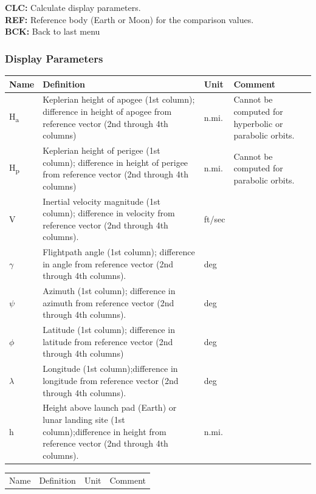 \documentclass[11pt]{article} %
\begin{document}
\textbf{CLC:} Calculate display parameters.\\
\textbf{REF:} Reference body (Earth or Moon) for the comparison values.\\
\textbf{BCK:} Back to last menu\\

\newpage
\begin{landscape}
\subsubsection{Display Parameters}

\begin{center}
\begin{tabular} { L{1cm} L{8cm} L{2cm} L{6cm} }
\hline
Name & Definition & Unit & Comment\\
\hline
H\textsubscript{a} & Keplerian height of apogee (1st column); difference in height of apogee from reference vector (2nd through 4th columns) & n.mi.&Cannot be computed for hyperbolic or parabolic orbits.\\
H\textsubscript{p} & Keplerian height of perigee (1st column); difference in height of perigee from reference vector (2nd through 4th columns) & n.mi.&Cannot be computed for parabolic orbits.\\
V&Inertial velocity magnitude (1st column); difference in velocity from reference vector (2nd through 4th columns).&ft/sec&\\
$\gamma$&Flightpath angle (1st column); difference in angle from reference vector (2nd through 4th columns).&deg&\\
$\psi$&Azimuth (1st column); difference in azimuth from reference vector (2nd through 4th columns).&deg&\\
$\phi$&Latitude (1st column); difference in latitude from reference vector (2nd through 4th columns)&deg&\\
$\lambda$&Longitude (1st column);difference in longitude from reference vector (2nd through 4th columns).&deg\\
h&Height above launch pad (Earth) or lunar landing site (1st column);difference in height from reference vector (2nd through 4th columns).&n.mi.&\\
\end{tabular}
\end{center}
\newpage
\begin{center}
\begin{tabular} { L{1cm} L{8cm} L{2cm} L{6cm} }
\hline
Name & Definition & Unit & Comment\\

\end{tabular}
\end{center}
\end{landscape}
\end{document}
